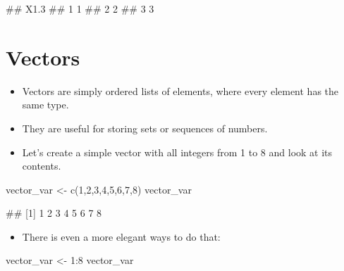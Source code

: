 \documentclass[
]{book}
\newenvironment{Shaded}{\begin{snugshade}}{\end{snugshade}}
\newcommand{\DecValTok}[1]{\textcolor[rgb]{0.00,0.00,0.81}{#1}}
\newcommand{\FunctionTok}[1]{\textcolor[rgb]{0.00,0.00,0.00}{#1}}
\newcommand{\NormalTok}[1]{#1}
\newcommand{\OtherTok}[1]{\textcolor[rgb]{0.56,0.35,0.01}{#1}}
\newcommand{\SpecialCharTok}[1]{\textcolor[rgb]{0.00,0.00,0.00}{#1}}
\providecommand{\tightlist}{%
  \setlength{\itemsep}{0pt}\setlength{\parskip}{0pt}}
\begin{document}
\begin{Shaded}
\begin{Highlighting}[]
\NormalTok{\#\#   X1.3}
\NormalTok{\#\# 1    1}
\NormalTok{\#\# 2    2}
\NormalTok{\#\# 3    3}
\end{Highlighting}
\end{Shaded}

\hypertarget{vectors}{%
\section{Vectors}\label{vectors}}

\begin{itemize}
\tightlist
\item
  Vectors are simply ordered lists of elements, where every element has the same type.
\item
  They are useful for storing sets or sequences of numbers.
\item
  Let's create a simple vector with all integers from 1 to 8 and look at its contents.
\end{itemize}

\begin{Shaded}
\begin{Highlighting}[]
\NormalTok{vector\_var }\OtherTok{\textless{}{-}} \FunctionTok{c}\NormalTok{(}\DecValTok{1}\NormalTok{,}\DecValTok{2}\NormalTok{,}\DecValTok{3}\NormalTok{,}\DecValTok{4}\NormalTok{,}\DecValTok{5}\NormalTok{,}\DecValTok{6}\NormalTok{,}\DecValTok{7}\NormalTok{,}\DecValTok{8}\NormalTok{)}
\NormalTok{vector\_var}
\end{Highlighting}
\end{Shaded}

\begin{Shaded}
\begin{Highlighting}[]
\NormalTok{\#\# [1] 1 2 3 4 5 6 7 8}
\end{Highlighting}
\end{Shaded}

\begin{itemize}
\tightlist
\item
  There is even a more elegant ways to do that:
\end{itemize}

\begin{Shaded}
\begin{Highlighting}[]
\NormalTok{vector\_var }\OtherTok{\textless{}{-}} \DecValTok{1}\SpecialCharTok{:}\DecValTok{8}
\NormalTok{vector\_var}
\end{Highlighting}
\end{Shaded}
\end{document}
